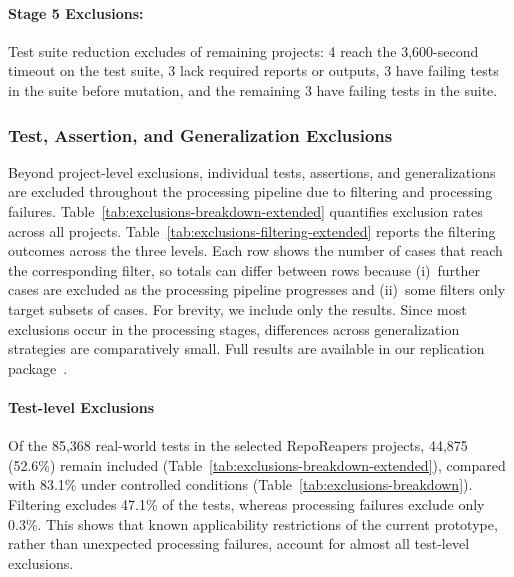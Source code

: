 \paragraph{Stage 5 Exclusions:}

Test suite reduction excludes \TzRealworldStageFiveExcluded{} of
\TzRealworldStageFiveEntering{} remaining projects:
4 reach the 3,600-second \ToolPit{} timeout on the \VariantInitial{} test suite,
3 lack required \ToolPit{} reports or \ToolJacoco{} outputs,
3 have failing tests in the \VariantInitial{} suite before mutation,
and the remaining 3 have failing tests in the \VariantImprovedC{} suite.

\subsubsection{Test, Assertion, and Generalization Exclusions}%
\label{sec:test-assertion-generalization-exclusions-extended}

Beyond project-level exclusions,
individual tests, assertions, and generalizations are excluded
throughout the processing pipeline due to filtering and processing failures.
Table~\ref{tab:exclusions-breakdown-extended} quantifies
exclusion rates across all \TzRealworldEligibleProjects{} projects.
Table~\ref{tab:exclusions-filtering-extended}
reports the filtering outcomes across the three levels.
Each row shows the number of cases that reach the corresponding filter,
so totals can differ between rows because
(i)~further cases are excluded as the processing pipeline progresses
and (ii)~some filters only target subsets of cases.
For brevity, we include only the \VariantImprovedC{} results.
Since most exclusions occur in the \VariantShared{} processing stages,
differences across generalization strategies are comparatively small.
Full results are available in our replication package~\cite{replicationpackage}.

\paragraph{Test-level Exclusions}%
\label{par:real-world-test-exclusions}

Of the 85,368 real-world tests in the selected RepoReapers projects,
44,875 (52.6\%) remain included (Table~\ref{tab:exclusions-breakdown-extended}),
compared with 83.1\% under controlled conditions (Table~\ref{tab:exclusions-breakdown}).
Filtering excludes 47.1\% of the tests, whereas processing failures exclude only 0.3\%.
This shows that known applicability restrictions of the current prototype,
rather than unexpected processing failures, account for almost all test-level exclusions.

